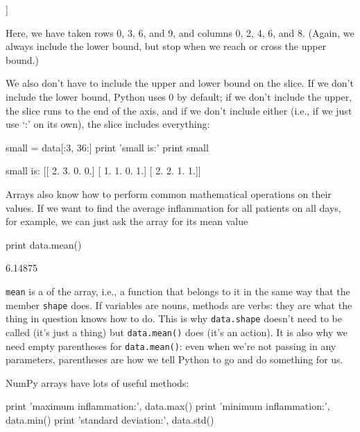 \begin{VerbOut}
[[ 0.  1.  1.  4.  8.]
 [ 0.  2.  4.  2.  6.]
 [ 0.  2.  4.  2.  5.]
 [ 0.  1.  1.  5.  5.]]
\end{VerbOut}

Here, we have taken rows 0, 3, 6, and 9, and columns 0, 2, 4, 6, and 8.
(Again, we always include the lower bound, but stop when we reach or
cross the upper bound.)

We also don't have to include the upper and lower bound on the slice. If
we don't include the lower bound, Python uses 0 by default; if we don't
include the upper, the slice runs to the end of the axis, and if we
don't include either (i.e., if we just use `:' on its own), the slice
includes everything:

\begin{VerbIn}
small = data[:3, 36:]
print 'small is:'
print small
\end{VerbIn}

\begin{VerbOut}
small is:
[[ 2.  3.  0.  0.]
 [ 1.  1.  0.  1.]
 [ 2.  2.  1.  1.]]
\end{VerbOut}

Arrays also know how to perform common mathematical operations on their
values. If we want to find the average inflammation for all patients on
all days, for example, we can just ask the array for its mean value

\begin{VerbIn}
print data.mean()
\end{VerbIn}

\begin{VerbOut}
6.14875
\end{VerbOut}

\texttt{mean} is a  of the array, i.e., a
function that belongs to it in the same way that the member
\texttt{shape} does. If variables are nouns, methods are verbs: they are
what the thing in question knows how to do. This is why
\texttt{data.shape} doesn't need to be called (it's just a thing) but
\texttt{data.mean()} does (it's an action). It is also why we need empty
parentheses for \texttt{data.mean()}: even when we're not passing in any
parameters, parentheses are how we tell Python to go and do something
for us.

NumPy arrays have lots of useful methods:

\begin{VerbIn}
print 'maximum inflammation:', data.max()
print 'minimum inflammation:', data.min()
print 'standard deviation:', data.std()
\end{VerbIn}

